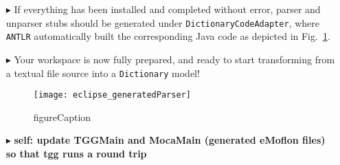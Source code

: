 \begin{itemize}
\item[$\blacktriangleright$] If everything has been installed and completed without error, parser and unparser stubs should be generated under
\texttt{DictionaryCodeAdapter}, where \texttt{ANTLR} automatically built the corresponding Java code as depicted in Fig.~\ref{eclipse:generatedParser}.

\item[$\blacktriangleright$] Your workspace is now fully prepared, and ready to start transforming from a textual file source into a \texttt{Dictionary} model!

\begin{figure}[htpb]
\begin{center}
  \texttt{[image: eclipse\_generatedParser]}
  \caption{figureCaption}
  \label{eclipse:generatedParser}
\end{center}
\end{figure}

\item[$\blacktriangleright$]  {\bf self: update TGGMain and MocaMain (generated eMoflon files) so that tgg runs a round trip}

\end{itemize}
